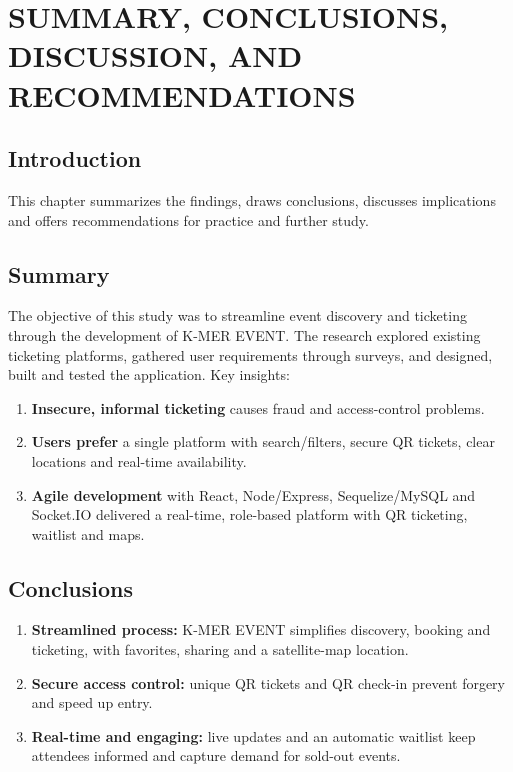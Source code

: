 \documentclass[12pt,a4paper]{report}
\begin{document}
\chapter{SUMMARY, CONCLUSIONS, DISCUSSION, AND RECOMMENDATIONS}

\section{Introduction}
This chapter summarizes the findings, draws conclusions, discusses implications and offers
recommendations for practice and further study.

\section{Summary}
The objective of this study was to streamline event discovery and ticketing through the
development of K-MER EVENT. The research explored existing ticketing platforms, gathered user
requirements through surveys, and designed, built and tested the application. Key insights:
\begin{enumerate}
  \item \textbf{Insecure, informal ticketing} causes fraud and access-control problems.
  \item \textbf{Users prefer} a single platform with search/filters, secure QR tickets,
        clear locations and real-time availability.
  \item \textbf{Agile development} with React, Node/Express, Sequelize/MySQL and Socket.IO
        delivered a real-time, role-based platform with QR ticketing, waitlist and maps.
\end{enumerate}

\section{Conclusions}
\begin{enumerate}
  \item \textbf{Streamlined process:} K-MER EVENT simplifies discovery, booking and
        ticketing, with favorites, sharing and a satellite-map location.
  \item \textbf{Secure access control:} unique QR tickets and QR check-in prevent forgery and
        speed up entry.
  \item \textbf{Real-time and engaging:} live updates and an automatic waitlist keep
        attendees informed and capture demand for sold-out events.
\end{enumerate}
\end{document}
